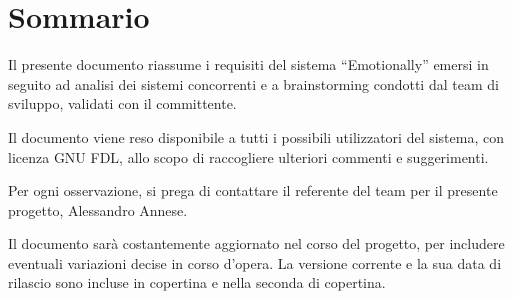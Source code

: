 
\chapter*{Sommario}\label{chap:sommario}

Il presente documento riassume i requisiti del sistema ``Emotionally'' emersi in
seguito ad analisi dei sistemi concorrenti e a brainstorming condotti dal team
di sviluppo, validati con il committente.

Il documento viene reso disponibile a tutti i possibili utilizzatori del
sistema, con licenza GNU FDL, allo scopo di raccogliere ulteriori commenti e
suggerimenti.

Per ogni osservazione, si prega di contattare il referente del team per il
presente progetto, Alessandro Annese.

Il documento sarà costantemente aggiornato nel corso del progetto, per includere
eventuali variazioni decise in corso d'opera. La versione corrente e la sua data
di rilascio sono incluse in copertina e nella seconda di copertina.
